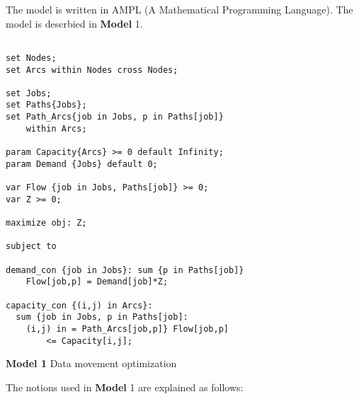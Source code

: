 
The model is written in AMPL (A Mathematical Programming Language). The model is descrbied in \textbf{Model} 1.

\begin{algorithm}[!htbp]

\begingroup
\fontsize{9pt}{9pt}\selectfont

\begin{verbatim}

set Nodes;
set Arcs within Nodes cross Nodes;

set Jobs;
set Paths{Jobs};
set Path_Arcs{job in Jobs, p in Paths[job]} 
    within Arcs;

param Capacity{Arcs} >= 0 default Infinity;
param Demand {Jobs} default 0;

var Flow {job in Jobs, Paths[job]} >= 0;
var Z >= 0;

maximize obj: Z;

subject to

demand_con {job in Jobs}: sum {p in Paths[job]} 
	Flow[job,p] = Demand[job]*Z;

capacity_con {(i,j) in Arcs}:
  sum {job in Jobs, p in Paths[job]: 
    (i,j) in = Path_Arcs[job,p]} Flow[job,p] 
		<= Capacity[i,j];

\end{verbatim}

\endgroup

\caption*{\textbf{Model 1} Data movement optimization}
\label{mod:opt}

\end{algorithm}

The notions used in \textbf{Model} 1 are explained as follows:

